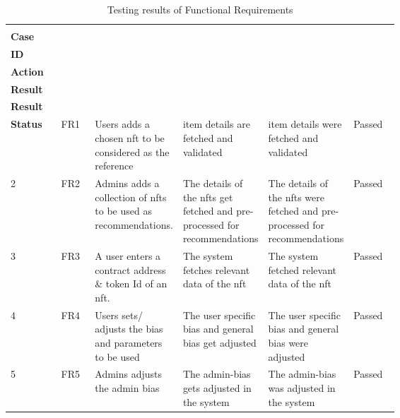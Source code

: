 \vspace{-4mm}
\begin{longtable}{|l|l|p{0.22\linewidth}|p{0.21\linewidth}|p{0.21\linewidth}|l|}
\caption{Testing results of Functional Requirements}
\label{tab:test-func-requirements}
\\ 
\hline
\begin{tabular}[c]{@{}l@{}}\textbf{Test}\\\textbf{Case}\end{tabular}
&
\begin{tabular}[c]{@{}l@{}}\textbf{FR}\\\textbf{ID}\end{tabular}
&
\begin{tabular}[c]{@{}c@{}}\textbf{User}\\\textbf{Action}\end{tabular}
&
\begin{tabular}[c]{@{}c@{}}\textbf{Expected}\\\textbf{Result}\end{tabular} & 
\begin{tabular}[c]{@{}c@{}}\textbf{Actual}\\\textbf{Result}\end{tabular} & \begin{tabular}[c]{@{}c@{}}\textbf{Result}\\\textbf{Status}\end{tabular}
\endfirsthead 
\hline
1 & FR1 & Users adds a chosen \gls{nft} to be considered as the reference & item details are fetched and validated & item details were fetched and validated & Passed \\ 
\hline
2 & FR2 & Admins adds a collection of \gls{nft}s to be used as recommendations. & The details of the \gls{nft}s get fetched and pre-processed for recommendations & The details of the \gls{nft}s were fetched and pre-processed for recommendations & Passed \\ 
\hline
3 & FR3 & A user enters a contract address \& token Id of an \gls{nft}. & The system fetches relevant data of the \gls{nft} & The system fetched relevant data of the \gls{nft} & Passed \\ 
\hline
4 & FR4 & Users sets/ adjusts the bias and parameters to be used & The user specific bias and general bias get adjusted & The user specific bias and general bias were adjusted & Passed \\
\hline
5 & FR5 & Admins adjusts the admin bias & The admin-bias gets adjusted in the system & The admin-bias was adjusted in the system & Passed \\ 

\end{longtable}
